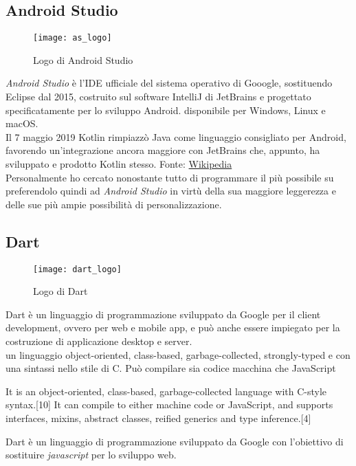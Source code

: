 \subsection{Android Studio}
\begin{figure}[ht]
    \centering
    \texttt{[image: as\_logo]}
    \caption{Logo di Android Studio}
\end{figure}\aCapo{}
\textit{Android Studio} è l'IDE ufficiale del sistema operativo di Gooogle, sostituendo Eclipse dal 2015, costruito sul software IntelliJ di JetBrains e progettato specificatamente per lo sviluppo Android. \E{} disponibile per Windows, Linux e macOS.\\
Il 7 maggio 2019 Kotlin rimpiazzò Java come linguaggio consigliato per Android, favorendo un'integrazione ancora maggiore con JetBrains che, appunto, ha sviluppato e prodotto Kotlin stesso. {\tiny Fonte: \href{https://en.wikipedia.org/wiki/Android_Studio}{Wikipedia}}\\
Personalmente ho cercato nonostante tutto di programmare il più possibile su \vsc{} preferendolo quindi ad \textit{Android Studio} in virtù della sua maggiore leggerezza e delle sue più ampie possibilità di personalizzazione.

\subsection{Dart}
\begin{figure}[ht]
    \centering
    \texttt{[image: dart\_logo]}
    \caption{Logo di Dart}
\end{figure}
Dart è un linguaggio di programmazione sviluppato da Google per il client development, ovvero per web e mobile app, e può anche essere impiegato per la costruzione di applicazione desktop e server.\\
\E{} un linguaggio object-oriented, class-based, garbage-collected, strongly-typed e con una sintassi nello stile di C. Può compilare sia codice macchina che JavaScript


It is an object-oriented, class-based, garbage-collected language with C-style syntax.[10] It can compile to either machine code or JavaScript, and supports interfaces, mixins, abstract classes, reified generics and type inference.[4] 

Dart è un linguaggio di programmazione sviluppato da Google con l'obiettivo di sostituire \textit{javascript} per lo sviluppo web.

